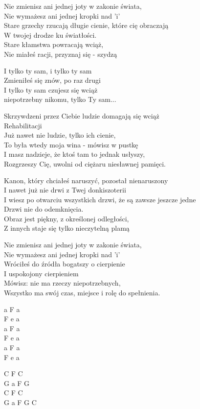 \begin{text}
    Nie zmienisz ani jednej joty w zakonie świata,\\
    Nie wymażesz ani jednej kropki nad 'i'\\
    Stare grzechy rzucają długie cienie, które cię obraczają\\
    W twojej drodze ku światłości.\\
    Stare kłamstwa powracają wciąż,\\
    Nie miałeś racji, przyznaj się - szydzą

    \vin I tylko ty sam, i tylko ty sam\\
    \vin Zmieniłeś się znów, po raz drugi\\
    \vin I tylko ty sam czujesz się wciąż\\
    \vin niepotrzebny nikomu, tylko Ty sam...

    Skrzywdzeni przez Ciebie ludzie domagają się wciąż\\
    Rehabilitacji\\
    Już nawet nie ludzie, tylko ich cienie,\\
    To była wtedy moja wina - mówisz w pustkę\\
    I masz nadzieje, że ktoś tam to jednak usłyszy,\\
    Rozgrzeszy Cię, uwolni od ciężaru niesławnej pamięci.

    Kanon, który chciałeś naruszyć, pozostał nienaruszony\\
    I nawet już nie drwi z Twej donkiszoterii\\
    I wiesz po otwarciu wszystkich drzwi, że są zawsze jeszcze jedne\\
    Drzwi nie do odemknięcia.\\
    Obraz jest piękny, z określonej odległości,\\
    Z innych staje się tylko nieczytelną plamą

    Nie zmienisz ani jednej joty w zakonie świata,\\
    Nie wymażesz ani jednej kropki nad 'i'\\
    Wróciłeś do źródła bogatszy o cierpienie\\
    I uspokojony cierpieniem\\
    Mówisz: nie ma rzeczy niepotrzebnych,\\
    Wszystko ma swój czas, miejsce i rolę do spełnienia.
\end{text}
\begin{chord}
    a F a\\
    F e a\\
    a F a\\
    F e a\\
    a F a\\
    F e a

    C F C\\
    G a F G\\
    C F C\\
    G a F G C
\end{chord}
